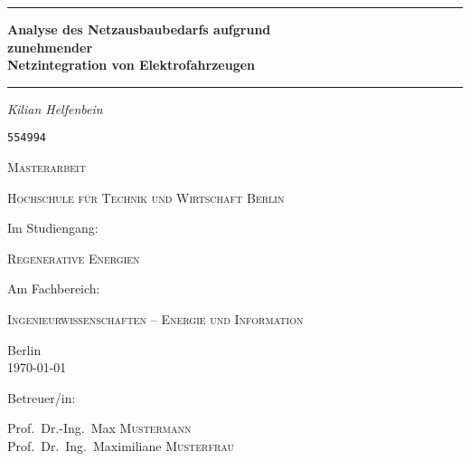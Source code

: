 \begin{titlepage}
	\centering
	\par\noindent\rule{\textwidth}{0.4pt}
	{\huge\bfseries Analyse des Netzausbaubedarfs aufgrund\\
	zunehmender\\
	Netzintegration von Elektrofahrzeugen\par}
	\par\noindent\rule{\textwidth}{0.4pt}\par
	\vspace*{2cm}
	{\Large\itshape Kilian Helfenbein\par}
	{\Large \texttt{554994}\par}
	\vspace{1.5cm}
	{\scshape\Large Masterarbeit\par}
	\vspace{1.5cm}
	{\scshape\LARGE Hochschule für Technik und Wirtschaft Berlin \par}
	\vspace{1cm}
	Im Studiengang:\par
	{\scshape\large Regenerative Energien\par}
	\vspace{.5cm}
	Am Fachbereich:\par
	{\scshape\large Ingenieurwissenschaften {--} Energie und Information\par}
	\vfill
	{\large Berlin\\
	\today\par}
	\vfill
	Betreuer/in:\par
	Prof.~Dr.-Ing.~Max \textsc{Mustermann}\\
	Prof.~Dr.~Ing.~Maximiliane \textsc{Musterfrau}
\end{titlepage}